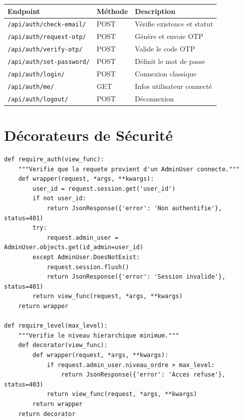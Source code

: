 \documentclass[12pt,a4paper,oneside]{report}
\begin{document}
\begin{center}
\begin{tabularx}{\textwidth}{l l X}
\toprule
\textbf{Endpoint} & \textbf{Méthode} & \textbf{Description} \\
\midrule
\texttt{/api/auth/check-email/} & POST & Vérifie existence et statut \\
\texttt{/api/auth/request-otp/} & POST & Génère et envoie OTP \\
\texttt{/api/auth/verify-otp/} & POST & Valide le code OTP \\
\texttt{/api/auth/set-password/} & POST & Définit le mot de passe \\
\texttt{/api/auth/login/} & POST & Connexion classique \\
\texttt{/api/auth/me/} & GET & Infos utilisateur connecté \\
\texttt{/api/auth/logout/} & POST & Déconnexion \\
\bottomrule
\end{tabularx}
\end{center}

\section{Décorateurs de Sécurité}

\begin{lstlisting}[style=python, title=Décorateurs @require\_auth et @require\_level]
def require_auth(view_func):
    """Verifie que la requete provient d'un AdminUser connecte."""
    def wrapper(request, *args, **kwargs):
        user_id = request.session.get('user_id')
        if not user_id:
            return JsonResponse({'error': 'Non authentifie'}, status=401)
        try:
            request.admin_user = AdminUser.objects.get(id_admin=user_id)
        except AdminUser.DoesNotExist:
            request.session.flush()
            return JsonResponse({'error': 'Session invalide'}, status=401)
        return view_func(request, *args, **kwargs)
    return wrapper

def require_level(max_level):
    """Verifie le niveau hierarchique minimum."""
    def decorator(view_func):
        def wrapper(request, *args, **kwargs):
            if request.admin_user.niveau_ordre > max_level:
                return JsonResponse({'error': 'Acces refuse'}, status=403)
            return view_func(request, *args, **kwargs)
        return wrapper
    return decorator
\end{lstlisting}
\end{document}
